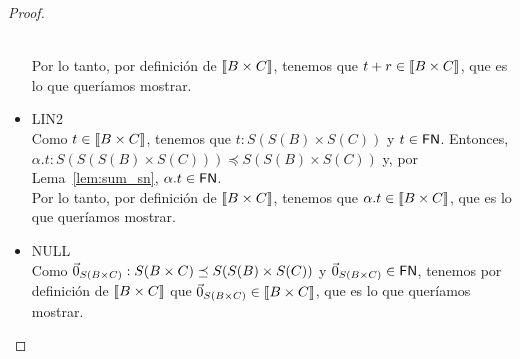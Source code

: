 \begin{proof}
\begin{itemize}
        \\ Por lo tanto, por definición de \( \llbracket B \times C\rrbracket \), tenemos que \( t + r \in \llbracket B \times C\rrbracket \), que es lo que queríamos mostrar.
      \item LIN2
        \\ Como \( t \in \llbracket B \times C\rrbracket \), tenemos que \( t : S(S(B) \times S(C)) \) y \( t \in \mathsf{FN} \). Entonces, \( \alpha . t : S(S(S(B) \times S(C))) \preceq S(S(B) \times S(C)) \) y, por Lema~\ref{lem:sum_sn}, \( \alpha . t \in \mathsf{FN} \).
        \\ Por lo tanto, por definición de \( \llbracket B \times C\rrbracket \), tenemos que \( \alpha . t \in \llbracket B \times C\rrbracket \), que es lo que queríamos mostrar.
      \item NULL
        \\ Como \( \vec{0}_{S (B \times C)} : S(B \times C) \preceq S(S(B) \times S(C)) \) y \( \vec{0}_{S (B \times C)} \in \mathsf{FN} \), tenemos por definición de \( \llbracket B \times C\rrbracket \) que \( \vec{0}_{S (B \times C)} \in \llbracket B \times C\rrbracket \), que es lo que queríamos mostrar.
    \end{itemize}

\end{proof}
